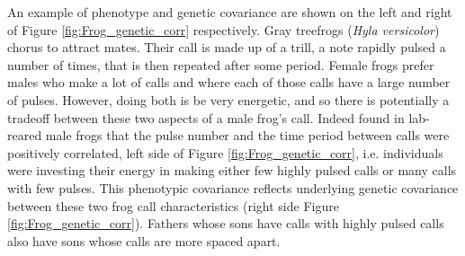 An example of phenotype and genetic covariance are shown on the left
and right of Figure \ref{fig:Frog_genetic_corr} respectively. Gray
treefrogs ({\it Hyla versicolor}) chorus to attract mates. Their call
is made up of a trill, a note rapidly pulsed a number of times, that
is then repeated after some
period. Female frogs prefer males who make a lot of calls and where each
of those calls have a large number
of pulses. However, doing both is be very energetic, and so
there is potentially a tradeoff between these two aspects of a male frog's
call. Indeed \citet{welch2014multivariate} found
in lab-reared male frogs that the pulse number and the time period between
calls were positively correlated, left side of Figure \ref{fig:Frog_genetic_corr}, i.e. individuals were investing
their energy in making either few highly pulsed calls or many calls
with few pulses. This phenotypic covariance reflects underlying
genetic covariance between these two frog call
characteristics (right side  Figure \ref{fig:Frog_genetic_corr}). Fathers whose sons have calls with highly pulsed
calls also have sons whose calls are more spaced apart.

